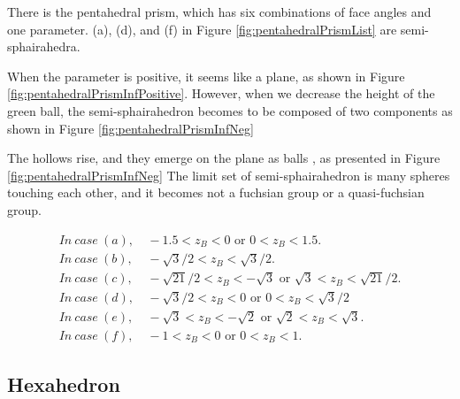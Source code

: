 \documentclass[suppldata, dvipdfmx]{interact}
\theoremstyle{plain}%
\theoremstyle{definition}
\theoremstyle{remark}
\theoremstyle{problemstyle}
\begin{document}
There is the pentahedral prism, which has six combinations of face angles
and one parameter.
(a), (d), and (f) in Figure \ref{fig:pentahedralPrismList} are
semi-sphairahedra.

When the parameter is positive, it seems like a plane, as shown in 
Figure \ref{fig:pentahedralPrismInfPositive}.
 However, when we decrease the height of the green ball, the
 semi-sphairahedron
 becomes to be composed of two components as shown in Figure \ref{fig:pentahedralPrismInfNeg}

The hollows rise, and they emerge on the plane as balls
, as presented in Figure \ref{fig:pentahedralPrismInfNeg}
The limit set of semi-sphairahedron is many spheres touching each other, and
it becomes not a fuchsian group or a quasi-fuchsian group.

\begin{align*} 
 In~case~(a),&~-1.5 < z_B < 0 \text{ or } 0 < z_B < 1.5.\\
 In~case~(b),&~-\sqrt{3}/2 < z_B < \sqrt{3}/2.\\
 In~case~(c),&~-\sqrt{21}/2 < z_B < -\sqrt{3} \text{ or } \sqrt{3} < z_B < \sqrt{21}/2.\\
 In~case~(d),&~-\sqrt{3}/2 < z_B < 0 \text{ or } 0 < z_B < \sqrt{3}/2\\
 In~case~(e),&~-\sqrt{3} < z_B < -\sqrt{2} \text{ or } \sqrt{2} < z_B < \sqrt{3}.\\
 In~case~(f),&~-1 < z_B < 0 \text{ or } 0 < z_B < 1.
\end{align*}

\subsection{Hexahedron}
\end{document}
